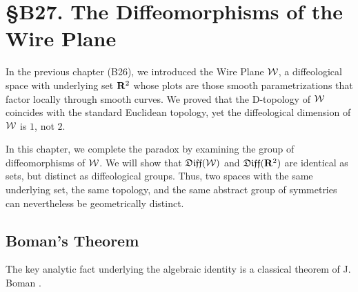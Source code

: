 
\chapter*{\S B27. The Diffeomorphisms of the Wire Plane}
\setcounter{footnote}{0}


\begin{abstract}
  We prove that the group of diffeomorphisms of the Wire Plane $\cW$
  is identical as a set to the standard diffeomorphism group $\Diff(\RR^2)$,
  yet the two groups are distinct as diffeological groups.
  This completes the Boman Paradox:
  two spaces with the same topology and the same abstract diffeomorphism group
  can be geometrically distinct.
\end{abstract}


In the previous chapter (B26),
we introduced the Wire Plane $\cW$,
a diffeological space with underlying set $\mathbf{R}^2$ whose plots are those smooth parametrizations that factor locally through smooth curves.
We proved that the D-topology of $\cW$ coincides with the standard Euclidean topology,
yet the diffeological dimension of $\cW$ is $1$, not $2$.

In this chapter,
we complete the paradox by examining the group of diffeomorphisms of $\cW$.
We will show that $\mathfrak{Diff}(\mathcal{W})$ and $\Diff(\RR^2)$ are identical as sets,
but distinct as diffeological groups.
Thus,
two spaces with the same underlying set,
the same topology,
and the same abstract group of symmetries
can nevertheless be geometrically distinct.

\section{Boman's Theorem}

The key analytic fact underlying the algebraic identity is a classical theorem of J. Boman \cite{Bom67}.

